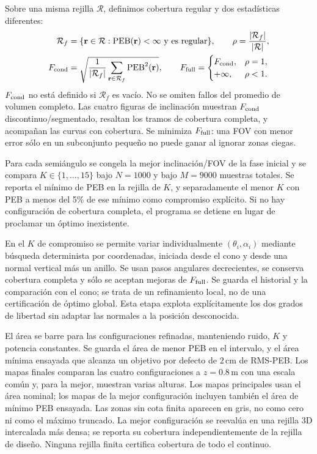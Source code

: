 \documentclass[11pt,a4paper]{article}
\newcommand{\PEB}{\operatorname{PEB}}
\begin{document}
Sobre una misma rejilla $\mathcal R$, definimos cobertura regular y dos estadísticas diferentes:
\begin{equation}
\begin{aligned}
\mathcal R_f&=\{\mathbf r\in\mathcal R:\PEB(\mathbf r)<\infty\text{ y es regular}\},\qquad
\rho=\frac{|\mathcal R_f|}{|\mathcal R|},\\
F_{\rm cond}&=\sqrt{\frac{1}{|\mathcal R_f|}\sum_{\mathbf r\in\mathcal R_f}\PEB^2(\mathbf r)},\qquad
F_{\rm full}=\begin{cases}F_{\rm cond},&\rho=1,\\+\infty,&\rho<1.\end{cases}
\end{aligned}
\label{eq:objective}
\end{equation}
$F_{\rm cond}$ no está definido si $\mathcal R_f$ es vacío. No se omiten fallos del promedio de volumen completo. Las cuatro figuras de inclinación muestran $F_{\rm cond}$ discontinuo/segmentado, resaltan los tramos de cobertura completa, y acompañan las curvas con cobertura. Se minimiza $F_{\rm full}$: una FOV con menor error sólo en un subconjunto pequeño no puede ganar al ignorar zonas ciegas.

Para cada semiángulo se congela la mejor inclinación/FOV de la fase inicial y se compara $K\in\{1,\ldots,15\}$ bajo $N=1000$ y bajo $M=9000$ muestras totales. Se reporta el mínimo de PEB en la rejilla de $K$, y separadamente el menor $K$ con PEB a menos del 5\% de ese mínimo como compromiso explícito. Si no hay configuración de cobertura completa, el programa se detiene en lugar de proclamar un óptimo inexistente.

En el $K$ de compromiso se permite variar individualmente $(\theta_i,\alpha_i)$ mediante búsqueda determinista por coordenadas, iniciada desde el cono y desde una normal vertical más un anillo. Se usan pasos angulares decrecientes, se conserva cobertura completa y sólo se aceptan mejoras de $F_{\rm full}$. Se guarda el historial y la comparación con el cono; se trata de un refinamiento local, no de una certificación de óptimo global. Esta etapa explota explícitamente los dos grados de libertad sin adaptar las normales a la posición desconocida.

El área se barre para las configuraciones refinadas, manteniendo ruido, $K$ y potencia constantes. Se guarda el área de menor PEB en el intervalo, y el área mínima ensayada que alcanza un objetivo por defecto de $2\,\mathrm{cm}$ de RMS-PEB. Los mapas finales comparan las cuatro configuraciones a $z=0.8\,\mathrm m$ con una escala común y, para la mejor, muestran varias alturas. Los mapas principales usan el área nominal; los mapas de la mejor configuración incluyen también el área de mínimo PEB ensayada. Las zonas sin cota finita aparecen en gris, no como cero ni como el máximo truncado. La mejor configuración se reevalúa en una rejilla 3D intercalada más densa; se reporta su cobertura independientemente de la rejilla de diseño. Ninguna rejilla finita certifica cobertura de todo el continuo.
\end{document}
